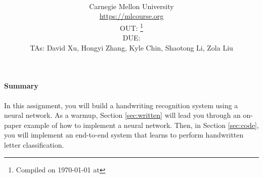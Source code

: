 \documentclass[11pt]{exam}
\title{\textsc{\hwName}} %
\author{\courseName\\
  Carnegie Mellon University \\
\url{https://mlcourse.org} \\
OUT: \outDate{}\thanks{Compiled on \today{} at \currenttime{}} \\
DUE: \dueDate{} \\ 
TAs: David Xu, Hongyi Zhang, Kyle Chin, Shaotong Li, Zola Liu}
\date{}
\date{}
\numberwithin{equation}{section} %
\numberwithin{figure}{section} %
\numberwithin{table}{section} %
\begin{document}
\maketitle

\begin{notebox}
\paragraph{Summary} In this assignment, you will build a handwriting recognition system using a neural network. As a warmup, Section \ref{sec:written} will lead you through an on-paper example of how to implement a neural network. Then, in Section \ref{sec:code}, you will implement an end-to-end system that learns to perform handwritten letter classification.
\end{notebox}
\end{document}
